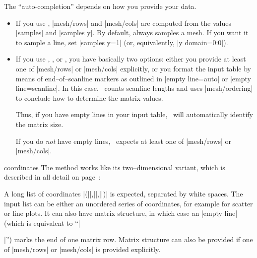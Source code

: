 {\begin{addplot3generic}
\begin{enumerate}
		The ``auto-completion'' depends on how you provide your data.
		\begin{itemize}
			\item 
		If you use , |mesh/rows| and |mesh/cols| are computed from the values |samples| and |samples y|. By default,  always samples a mesh. If you want it to sample a line, set |samples y=1| (or, equivalently, |y domain=0:0|).
			\item If you use , , or , you have basically two options: either you provide at least one of |mesh/rows| or |mesh/cols| explicitly, or you format the input table by means of end--of--scanline markers as outlined in |empty line=auto| or |empty line=scanline|. In this case, \PGFPlots\ counts scanline lengths and uses |mesh/ordering| to conclude how to determine the matrix values.

			Thus, if you have empty lines in your input table, \PGFPlots\ will automatically identify the matrix size.

			If you do \emph{not} have empty lines, \PGFPlots\ expects at least one of |mesh/rows| or |mesh/cols|.
		\end{itemize}

	\end{enumerate}
\end{addplot3generic}

\begin{addplot3operation}[]{coordinates}{}
	The  method works like its two--dimensional variant,  which is described in all detail on page~\pageref{pgfplots:addplot:coordinates}:

	A long list of coordinates |(||,||,||)| is expected, separated by white spaces. The input list can be either an unordered series of coordinates, for example for scatter or line plots. It can also have matrix structure, in which case an |empty line| (which is equivalent to ``|\par|'') marks the end of one matrix row. Matrix structure can also be provided if one of |mesh/rows| or |mesh/cols| is provided explicitly.
	
\begin{codeexample}[]
\end{codeexample}
\end{addplot3operation}}
